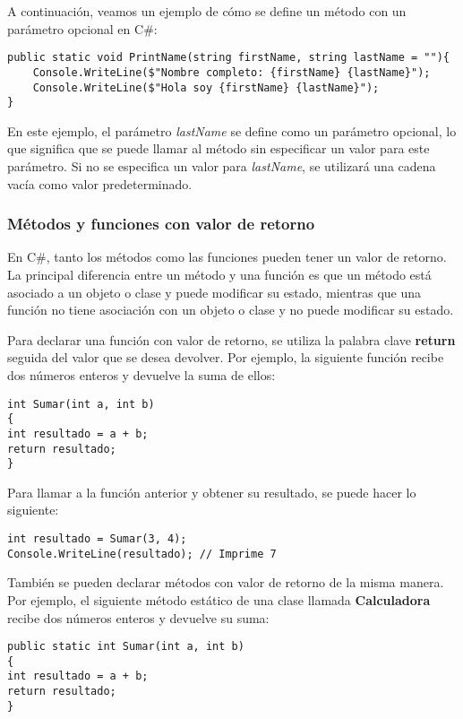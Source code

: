 \documentclass[executivepaper]{article}
\begin{document}
A continuación, veamos un ejemplo de cómo se define un método con un parámetro opcional en C\#:

\begin{lstlisting}
public static void PrintName(string firstName, string lastName = ""){
    Console.WriteLine($"Nombre completo: {firstName} {lastName}");
    Console.WriteLine($"Hola soy {firstName} {lastName}");
}
\end{lstlisting}

En este ejemplo, el parámetro \emph{lastName} se define como un parámetro opcional, lo que significa que se puede llamar al método sin especificar un valor para este parámetro. Si no se especifica un valor para \emph{lastName}, se utilizará una cadena vacía como valor predeterminado.

\subsubsection*{Métodos y funciones con valor de retorno}

En C\#, tanto los métodos como las funciones pueden tener un valor de retorno. La principal diferencia entre un método y una función es que un método está asociado a un objeto o clase y puede modificar su estado, mientras que una función no tiene asociación con un objeto o clase y no puede modificar su estado.

Para declarar una función con valor de retorno, se utiliza la palabra clave \textbf{return} seguida del valor que se desea devolver. Por ejemplo, la siguiente función recibe dos números enteros y devuelve la suma de ellos:

\begin{lstlisting}
int Sumar(int a, int b)
{
int resultado = a + b;
return resultado;
}
\end{lstlisting}

Para llamar a la función anterior y obtener su resultado, se puede hacer lo siguiente:

\begin{lstlisting}
int resultado = Sumar(3, 4);
Console.WriteLine(resultado); // Imprime 7
\end{lstlisting}

También se pueden declarar métodos con valor de retorno de la misma manera. Por ejemplo, el siguiente método estático de una clase llamada \textbf{Calculadora} recibe dos números enteros y devuelve su suma:

\begin{lstlisting}
public static int Sumar(int a, int b)
{
int resultado = a + b;
return resultado;
}
\end{lstlisting}
\end{document}
